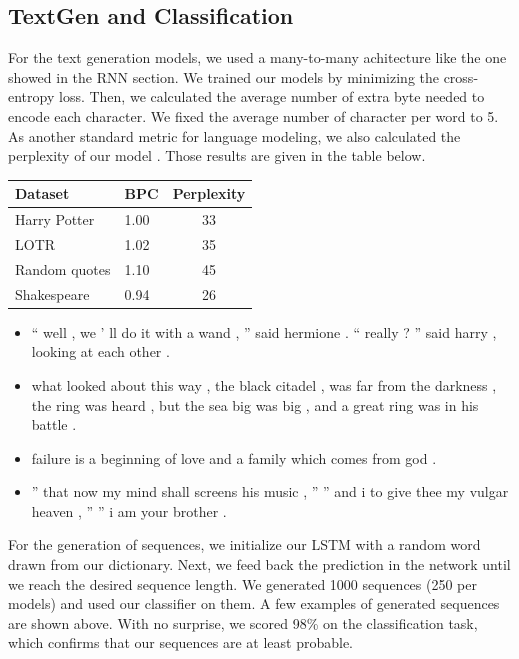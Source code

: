\documentclass[landscape,a0paper,fontscale=0.34]{baposter}
\newcommand{\compresslist}{
  \setlength{\itemsep}{1pt}
  \setlength{\parskip}{0pt}
  \setlength{\parsep}{0pt}}
\begin{document}
\begin{poster}
{\begin{multicols}{2}
\begin{center}
\subsection*{TextGen and Classification}
\end{center}
For the text generation models, we used a many-to-many achitecture like the one
showed in the RNN section. We trained our models by minimizing the
cross-entropy loss. Then, we calculated the average number of extra byte needed
to encode each character. We fixed the average number of character per word to
5. As another standard metric for language modeling, we also calculated the
perplexity of our model \cite{gravesGenerating}. Those results are given in the table below.  \\
\begin{center}
\begin{tabular}{|l|l|c|}
\hline
Dataset & BPC & Perplexity \\
\hline
Harry Potter & 1.00 & 33 \\
LOTR & 1.02 & 35 \\
Random quotes & 1.10 & 45 \\
Shakespeare & 0.94 & 26\\
\hline
\end{tabular}
\end{center}

\begin{itemize}\compresslist
    \item `` well , we ' ll do it with a wand , '' said hermione . `` really ?
      '' said harry , looking at each other .
    \item  what looked about this
      way , the black citadel , was far from the
          darkness , the ring was heard , but the sea big was big , and a great
          ring was in his battle .
    \item failure is a beginning of love and a family which comes from god .
    \item  '' that now my mind shall screens his music , '' '' and i to give
      thee my vulgar heaven , '' '' i am your brother .
\end{itemize}
For the generation of sequences, we initialize our LSTM with a random word
drawn from our dictionary. Next, we feed back the prediction in the network
until we reach the desired sequence length. We generated 1000 sequences (250
per models) and used our classifier on them. A few examples of generated
sequences are shown above. With no surprise, we scored 98\% on the
classification task, which confirms that our sequences are at least probable.


\end{multicols}}
\end{poster}
\end{document}
